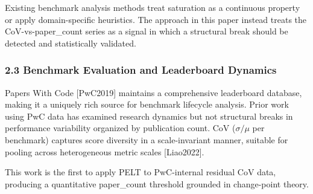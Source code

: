 Existing benchmark analysis methods treat saturation as a continuous property or apply domain-specific heuristics. The approach in this paper instead treats the CoV-vs-paper\_count series as a signal in which a structural break should be detected and statistically validated.

\subsubsection{2.3 Benchmark Evaluation and Leaderboard Dynamics}

Papers With Code [PwC2019] maintains a comprehensive leaderboard database, making it a uniquely rich source for benchmark lifecycle analysis. Prior work using PwC data has examined research dynamics but not structural breaks in performance variability organized by publication count. CoV ($\sigma /\mu$ per benchmark) captures score diversity in a scale-invariant manner, suitable for pooling across heterogeneous metric scales [Liao2022].

This work is the first to apply PELT to PwC-internal residual CoV data, producing a quantitative paper\_count\* threshold grounded in change-point theory.

